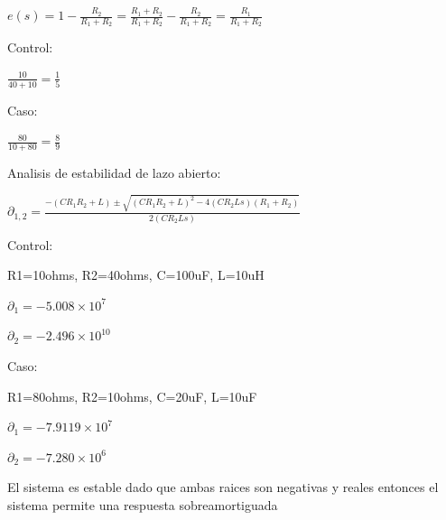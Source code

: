 \documentclass{article}%
\begin{document}
\begin{thebibliography}{}
$e(s)=1-\frac{R_{2}}{R_{1}+R_{2}}=\frac{R_{1}+R_{2}}{R_{1}+R_{2}}-\frac{R_{2}%
}{R_{1}+R_{2}}=\frac{R_{1}}{R_{1}+R_{2}}$

Control:

$\frac{10}{40+10}=\frac{1}{5}$

Caso:

$\frac{80}{10+80}=\frac{8}{9}$

Analisis de estabilidad de lazo abierto:

$\partial_{1,2}=\frac{-(CR_{1}R_{2}+L)\pm\sqrt{(CR_{1}R_{2}+L)^{2}%
-4(CR_{2}Ls)(R_{1}+R_{2})}}{2(CR_{2}Ls)}$

Control:

R1=10ohms, R2=40ohms, C=100uF, L=10uH

$\partial_{1}=-5.008\times10^{7}$

$\partial_{2}=-2.496\times10^{10}$

Caso:

R1=80ohms, R2=10ohms, C=20uF, L=10uF

$\partial_{1}=-7.9119\times10^{7}$

$\partial_{2}=-7.280\times10^{6}$

El sistema es estable dado que ambas raices son negativas y reales entonces el
sistema permite una respuesta sobreamortiguada
\end{thebibliography}
\end{document}
